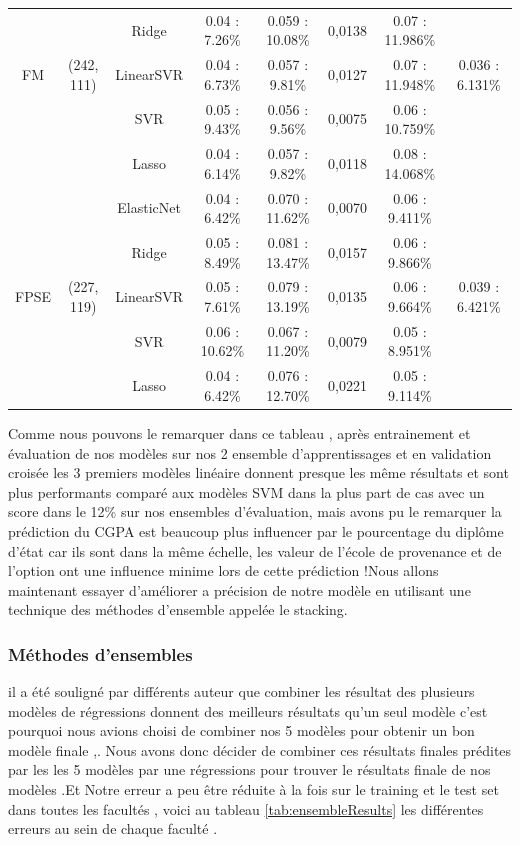 \begin{table}
{{\begin{tabular}{|c|c|c|c|c|c|c|c|}
		&              &       Ridge &   0.04 : 7.26\% &  0.059  : 10.08\% &       0,0138 &  0.07 : 11.986\% &                 \\ \cline{3-8}
		FM &   (242, 111) &   LinearSVR &   0.04 : 6.73\% &   0.057  : 9.81\% &       0,0127 &  0.07 : 11.948\% &  0.036 : 6.131\% \\ \cline{3-8}
		&              &         SVR &   0.05 : 9.43\% &   0.056  : 9.56\% &       0,0075 &  0.06 : 10.759\% &                 \\ \cline{3-8}
		&              &       Lasso &   0.04 : 6.14\% &   0.057  : 9.82\% &       0,0118 &  0.08 : 14.068\% &                 \\ \cline{1-8}
		&              &  ElasticNet &   0.04 : 6.42\% &  0.070  : 11.62\% &       0,0070 &   0.06 : 9.411\% &                 \\ \cline{3-8}
		&              &       Ridge &   0.05 : 8.49\% &  0.081  : 13.47\% &       0,0157 &   0.06 : 9.866\% &                 \\ \cline{3-8}
		FPSE &   (227, 119) &   LinearSVR &   0.05 : 7.61\% &  0.079  : 13.19\% &       0,0135 &   0.06 : 9.664\% &  0.039 : 6.421\% \\ \cline{3-8}
		&              &         SVR &  0.06 : 10.62\% &  0.067  : 11.20\% &       0,0079 &   0.05 : 8.951\% &                 \\ \cline{3-8}
		&              &       Lasso &   0.04 : 6.42\% &  0.076  : 12.70\% &       0,0221 &   0.05 : 9.114\% &                 \\ \cline{1-8}
	\end{tabular}}}
	\endgroup
\end{table}
\newpage
Comme nous pouvons le remarquer dans ce tableau , après entrainement et évaluation de nos modèles sur nos 2 ensemble d'apprentissages et en validation croisée les 3 premiers modèles linéaire donnent presque les même résultats et sont plus performants comparé aux modèles \ac{SVM} dans la plus part de cas avec un score dans le 12\% sur nos ensembles d'évaluation, mais avons pu le remarquer la prédiction du \ac{CGPA} est beaucoup plus influencer par le pourcentage du diplôme d'état car ils sont dans la même échelle, les valeur de l'école de provenance et de l'option ont une influence minime lors de cette prédiction !Nous allons maintenant essayer d'améliorer a précision de notre modèle en utilisant  une technique des méthodes d'ensemble appelée le stacking.
\subsubsection{Méthodes d'ensembles}
il a été souligné par différents auteur \cite{bookSckit-Learn} que combiner les résultat des plusieurs modèles de régressions donnent des meilleurs résultats qu'un seul modèle c'est pourquoi nous avions choisi de combiner nos 5 modèles pour obtenir un bon modèle finale ,.
Nous avons donc décider de combiner ces résultats finales prédites par les  les 5 modèles par une régressions pour trouver le résultats finale de nos modèles .Et Notre erreur a peu être réduite à la fois sur le training et le test set dans toutes les facultés , voici au tableau \ref{tab:ensembleResults} les différentes erreurs au sein de chaque faculté .
